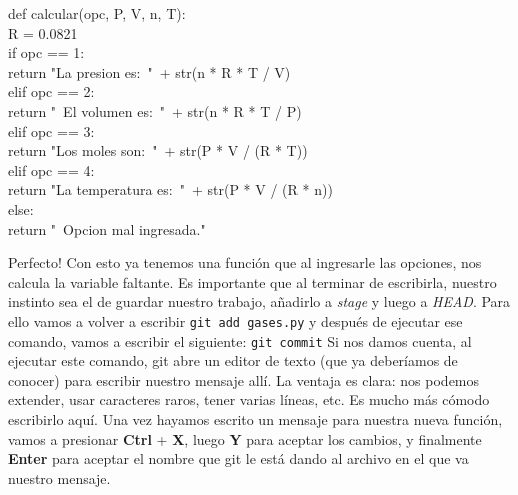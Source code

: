 \documentclass[10pt,letterpaper]{article}
\newcommand{\inlinecode}[1]{
\colorbox{light-gray}{\texttt{#1}}
}
\newenvironment{Code}
{
\begin{lrbox}{\selvestebox}%
\begin{minipage}{\dimexpr\columnwidth-2\fboxsep\relax}
\fontfamily{\ttdefault}\selectfont
}
{\end{minipage}\end{lrbox}%
\begin{center}
\colorbox{light-gray}{\usebox{\selvestebox}}
\end{center}
}
\begin{document}
\begin{Code}
def calcular(opc, P, V, n, T):\\
\hspace*{8mm}R = 0.0821\\
\hspace*{8mm}if opc == 1:\\
\hspace*{16mm}return "La presion es:\ "\ + str(n * R * T / V)\\
\hspace*{8mm}elif opc == 2:\\
\hspace*{16mm}return "\ \hspace*{-1.5mm}El volumen es:\ "\ + str(n * R * T / P)\\
\hspace*{8mm}elif opc == 3:\\
\hspace*{16mm}return "Los moles son:\ "\ + str(P * V / (R * T))\\
\hspace*{8mm}elif opc == 4:\\
\hspace*{16mm}return "La temperatura es:\ "\ + str(P * V / (R * n))\\
\hspace*{8mm}else:\\
\hspace*{16mm}return "\ \hspace*{-1.5mm}Opcion mal ingresada."
\end{Code}

Perfecto! Con esto ya tenemos una funci\'on que al ingresarle las opciones, nos calcula la variable faltante. Es importante que al terminar de escribirla, nuestro instinto sea el de guardar nuestro trabajo, a\~nadirlo a \textit{stage} y luego a \textit{HEAD}. Para ello vamos a volver a escribir \inlinecode{git add gases.py} y despu\'es de ejecutar ese comando, vamos a escribir el siguiente: \inlinecode{git commit} Si nos damos cuenta, al ejecutar este comando, git abre un editor de texto (que ya deber\'iamos de conocer) para escribir nuestro mensaje all\'i. La ventaja es clara: nos podemos extender, usar caracteres raros, tener varias l\'ineas, etc. Es mucho m\'as c\'omodo escribirlo aqu\'i. Una vez hayamos escrito un mensaje para nuestra nueva funci\'on, vamos a presionar \textbf{Ctrl} + \textbf{X}, luego \textbf{Y} para aceptar los cambios, y finalmente \textbf{Enter} para aceptar el nombre que git le est\'a dando al archivo en el que va nuestro mensaje.\\
\end{document}
